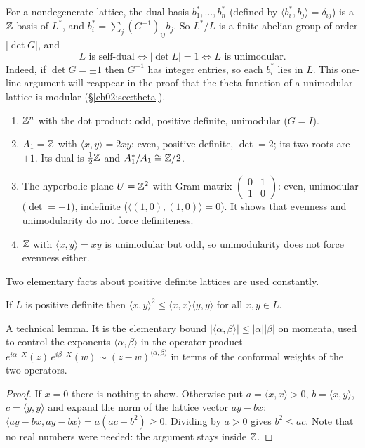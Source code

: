 For a nondegenerate lattice, the dual basis $b_1^*,\dots,b_n^*$ (defined by $\langle
b_i^*,b_j\rangle=\delta_{ij}$) is a ${\mathbb{Z}}$-basis of $L^*$, and $b_i^*=\sum_j (G^{-1})_{ij}b_j$.  So
$L^*/L$ is a finite abelian group of order $|\det G|$, and
\begin{equation}\label{ch02:eq:selfdual}
L \text{ is self-dual}\iff |\det L|=1 \iff L\text{ is unimodular}.
\end{equation}
Indeed, if $\det G=\pm1$ then $G^{-1}$ has integer entries, so each $b_i^*$ lies in $L$.  This
one-line argument will reappear in the proof that the theta function of a unimodular lattice is
modular (\S\ref{ch02:sec:theta}).

\begin{example}\label{ch02:ex:basic}
\begin{enumerate}
\item ${\mathbb{Z}}^n$ with the dot product: odd, positive definite, unimodular ($G=I$).
\item $A_1={\mathbb{Z}}$ with $\langle x,y\rangle=2xy$: even, positive definite, $\det=2$; its two roots are
      $\pm1$.  Its dual is $\tfrac12{\mathbb{Z}}$ and $A_1^*/A_1\cong{\mathbb{Z}}/2$.
\item The hyperbolic plane $U={\mathbb{Z}}^2$ with Gram matrix $\begin{pmatrix}0&1\\1&0\end{pmatrix}$:
      even, unimodular ($\det=-1$), indefinite ($\langle(1,0),(1,0)\rangle=0$).  It shows that
      evenness and unimodularity do not force definiteness.
\item ${\mathbb{Z}}$ with $\langle x,y\rangle=xy$ is unimodular but odd, so unimodularity does not force
      evenness either.
\end{enumerate}
\end{example}

Two elementary facts about positive definite lattices are used constantly.

\begin{lemma}\label{ch02:lem:cs}
If $L$ is positive definite then $\langle x,y\rangle^2\le\langle x,x\rangle\langle y,y\rangle$ for
all $x,y\in L$.
\end{lemma}
\begin{physics}
A technical lemma. It is the elementary bound $|\langle\alpha,\beta\rangle|\le|\alpha||\beta|$ on momenta, used to control the exponents $\langle\alpha,\beta\rangle$ in the operator product $e^{i\alpha\cdot X}(z)\,e^{i\beta\cdot X}(w)\sim(z-w)^{\langle\alpha,\beta\rangle}$ in terms of the conformal weights of the two operators.
\end{physics}
\begin{proof}
If $x=0$ there is nothing to show.  Otherwise put $a=\langle x,x\rangle>0$, $b=\langle x,y\rangle$,
$c=\langle y,y\rangle$ and expand the norm of the lattice vector $a y-b x$:
$\langle ay-bx,ay-bx\rangle=a(ac-b^2)\ge0$.  Dividing by $a>0$ gives $b^2\le ac$.  Note that no
real numbers were needed: the argument stays inside ${\mathbb{Z}}$.
\end{proof}

